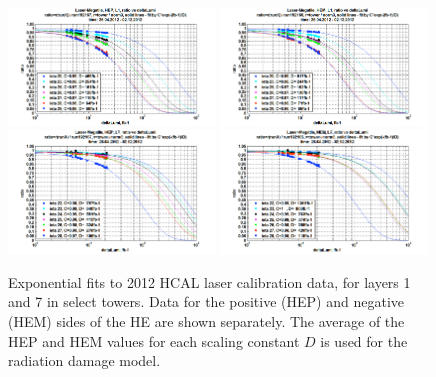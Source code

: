 \begin{figure}[hbtp]
  \begin{center}
    \includegraphics[width=0.49\textwidth]{figures/laserdatafits_HEP_layer1.png}
    \includegraphics[width=0.49\textwidth]{figures/laserdatafits_HEM_layer1.png}
    \includegraphics[width=0.49\textwidth]{figures/laserdatafits_HEP_layer7.png}
    \includegraphics[width=0.49\textwidth]{figures/laserdatafits_HEM_layer7.png}
    \caption{Exponential fits to 2012 HCAL laser calibration data, for layers 1 and 7 in select towers. Data for the positive (HEP) and negative (HEM) sides of the HE are shown separately. The average of the HEP and HEM values for each scaling constant $D$ is used for the radiation damage model.~\cite{epshteyn}}
    \label{fig:laserdatafits}
  \end{center}
\end{figure}

